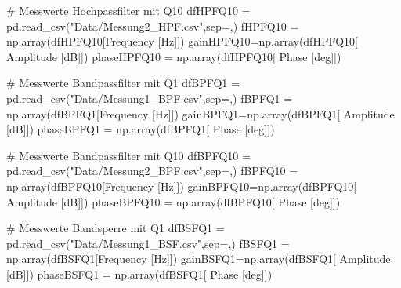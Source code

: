\documentclass[
  ngerman,
  letterpaper,
  DIV=11]{scrreprt}
\newenvironment{Shaded}{}{}
\newcommand{\CommentTok}[1]{\textcolor[rgb]{0.42,0.45,0.49}{#1}}
\newcommand{\NormalTok}[1]{\textcolor[rgb]{0.14,0.16,0.18}{#1}}
\newcommand{\OperatorTok}[1]{\textcolor[rgb]{0.14,0.16,0.18}{#1}}
\newcommand{\StringTok}[1]{\textcolor[rgb]{0.01,0.18,0.38}{#1}}
\begin{document}
\begin{Shaded}
\begin{Highlighting}[]
\CommentTok{\# Messwerte Hochpassfilter mit Q10}
\NormalTok{dfHPFQ10 }\OperatorTok{=}\NormalTok{ pd.read\_csv(}\StringTok{"Data/Messung2\_HPF.csv"}\NormalTok{,sep}\OperatorTok{=}\StringTok{\textquotesingle{},\textquotesingle{}}\NormalTok{)}
\NormalTok{fHPFQ10 }\OperatorTok{=}\NormalTok{ np.array(dfHPFQ10[}\StringTok{\textquotesingle{}Frequency [Hz]\textquotesingle{}}\NormalTok{])}
\NormalTok{gainHPFQ10}\OperatorTok{=}\NormalTok{np.array(dfHPFQ10[}\StringTok{\textquotesingle{} Amplitude [dB]\textquotesingle{}}\NormalTok{])}
\NormalTok{phaseHPFQ10 }\OperatorTok{=}\NormalTok{ np.array(dfHPFQ10[}\StringTok{\textquotesingle{} Phase [deg]\textquotesingle{}}\NormalTok{])}

\CommentTok{\# Messwerte Bandpassfilter mit Q1}
\NormalTok{dfBPFQ1 }\OperatorTok{=}\NormalTok{ pd.read\_csv(}\StringTok{"Data/Messung1\_BPF.csv"}\NormalTok{,sep}\OperatorTok{=}\StringTok{\textquotesingle{},\textquotesingle{}}\NormalTok{)}
\NormalTok{fBPFQ1 }\OperatorTok{=}\NormalTok{ np.array(dfBPFQ1[}\StringTok{\textquotesingle{}Frequency [Hz]\textquotesingle{}}\NormalTok{])}
\NormalTok{gainBPFQ1}\OperatorTok{=}\NormalTok{np.array(dfBPFQ1[}\StringTok{\textquotesingle{} Amplitude [dB]\textquotesingle{}}\NormalTok{])}
\NormalTok{phaseBPFQ1 }\OperatorTok{=}\NormalTok{ np.array(dfBPFQ1[}\StringTok{\textquotesingle{} Phase [deg]\textquotesingle{}}\NormalTok{])}

\CommentTok{\# Messwerte Bandpassfilter mit Q10}
\NormalTok{dfBPFQ10 }\OperatorTok{=}\NormalTok{ pd.read\_csv(}\StringTok{"Data/Messung2\_BPF.csv"}\NormalTok{,sep}\OperatorTok{=}\StringTok{\textquotesingle{},\textquotesingle{}}\NormalTok{)}
\NormalTok{fBPFQ10 }\OperatorTok{=}\NormalTok{ np.array(dfBPFQ10[}\StringTok{\textquotesingle{}Frequency [Hz]\textquotesingle{}}\NormalTok{])}
\NormalTok{gainBPFQ10}\OperatorTok{=}\NormalTok{np.array(dfBPFQ10[}\StringTok{\textquotesingle{} Amplitude [dB]\textquotesingle{}}\NormalTok{])}
\NormalTok{phaseBPFQ10 }\OperatorTok{=}\NormalTok{ np.array(dfBPFQ10[}\StringTok{\textquotesingle{} Phase [deg]\textquotesingle{}}\NormalTok{])}

\CommentTok{\# Messwerte Bandsperre mit Q1}
\NormalTok{dfBSFQ1 }\OperatorTok{=}\NormalTok{ pd.read\_csv(}\StringTok{"Data/Messung1\_BSF.csv"}\NormalTok{,sep}\OperatorTok{=}\StringTok{\textquotesingle{},\textquotesingle{}}\NormalTok{)}
\NormalTok{fBSFQ1 }\OperatorTok{=}\NormalTok{ np.array(dfBSFQ1[}\StringTok{\textquotesingle{}Frequency [Hz]\textquotesingle{}}\NormalTok{])}
\NormalTok{gainBSFQ1}\OperatorTok{=}\NormalTok{np.array(dfBSFQ1[}\StringTok{\textquotesingle{} Amplitude [dB]\textquotesingle{}}\NormalTok{])}
\NormalTok{phaseBSFQ1 }\OperatorTok{=}\NormalTok{ np.array(dfBSFQ1[}\StringTok{\textquotesingle{} Phase [deg]\textquotesingle{}}\NormalTok{])}


\end{Highlighting}
\end{Shaded}
\end{document}

